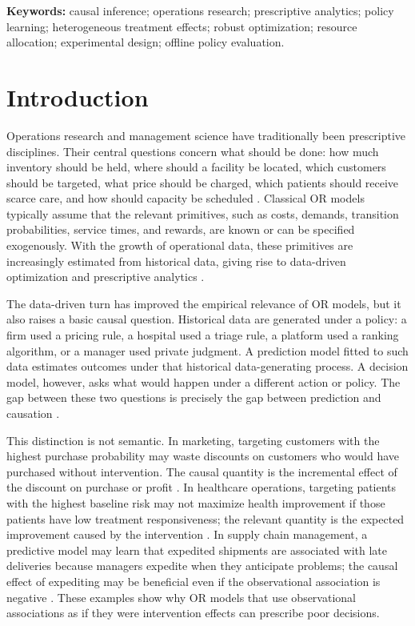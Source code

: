 \documentclass[11pt]{article}
\begin{document}
\noindent\textbf{Keywords:} causal inference; operations research; prescriptive analytics; policy learning; heterogeneous treatment effects; robust optimization; resource allocation; experimental design; offline policy evaluation.

\tableofcontents
\newpage

\section{Introduction}

Operations research and management science have traditionally been prescriptive disciplines. Their central questions concern what should be done: how much inventory should be held, where should a facility be located, which customers should be targeted, what price should be charged, which patients should receive scarce care, and how should capacity be scheduled \citep{bertsimas1997introduction,simchi2004managing,gallego1994optimal}. Classical OR models typically assume that the relevant primitives, such as costs, demands, transition probabilities, service times, and rewards, are known or can be specified exogenously. With the growth of operational data, these primitives are increasingly estimated from historical data, giving rise to data-driven optimization and prescriptive analytics \citep{bertsimas2020predictive,misic2020data,choi2018bigdata}.

The data-driven turn has improved the empirical relevance of OR models, but it also raises a basic causal question. Historical data are generated under a policy: a firm used a pricing rule, a hospital used a triage rule, a platform used a ranking algorithm, or a manager used private judgment. A prediction model fitted to such data estimates outcomes under that historical data-generating process. A decision model, however, asks what would happen under a different action or policy. The gap between these two questions is precisely the gap between prediction and causation \citep{rubin1974estimating,holland1986statistics,pearl2009causality,imbens2015causal,hernan2020causal}.

This distinction is not semantic. In marketing, targeting customers with the highest purchase probability may waste discounts on customers who would have purchased without intervention. The causal quantity is the incremental effect of the discount on purchase or profit \citep{fernandez2022causal,leporeni2023causally}. In healthcare operations, targeting patients with the highest baseline risk may not maximize health improvement if those patients have low treatment responsiveness; the relevant quantity is the expected improvement caused by the intervention \citep{murphy2003dynamic,zhang2012robust}. In supply chain management, a predictive model may learn that expedited shipments are associated with late deliveries because managers expedite when they anticipate problems; the causal effect of expediting may be beneficial even if the observational association is negative \citep{ho2017causal}. These examples show why OR models that use observational associations as if they were intervention effects can prescribe poor decisions.
\end{document}
